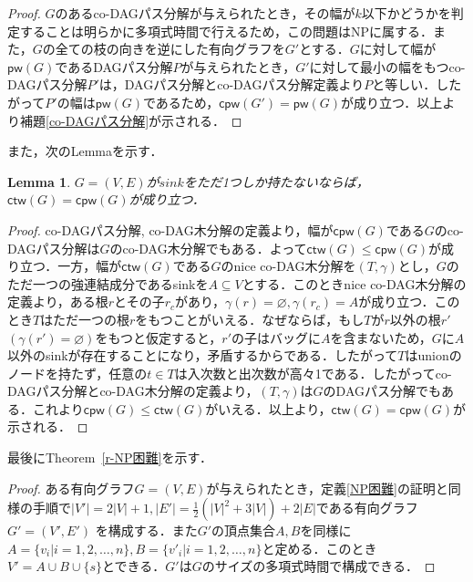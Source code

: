\documentclass[master]{kuisthesis}		%
\theoremstyle{plain}
\newtheorem{lemma}{Lemma}
\theoremstyle{definition}
\begin{document}
{\begin{proof}
    $G$のあるco-DAGパス分解が与えられたとき，その幅が$k$以下かどうかを判定することは明らかに多項式時間で行えるため，この問題はNPに属する．また，$G$の全ての枝の向きを逆にした有向グラフを$G'$とする．$G$に対して幅が$\mathsf{pw}(G)$であるDAGパス分解$P$が与えられたとき，$G'$に対して最小の幅をもつco-DAGパス分解$P'$は，DAGパス分解とco-DAGパス分解定義より$P$と等しい．したがって$P'$の幅は$\mathsf{pw}(G)$であるため，$\mathsf{cpw}(G')= \mathsf{pw}(G)$が成り立つ．以上より補題\ref{co-DAGパス分解}が示される．
\end{proof}





また，次のLemmaを示す．

\begin{lemma}\label{r-sink}
    $G =(V, E)$が$sink$をただ1つしか持たないならば，$\mathsf{ctw}(G) = \mathsf{cpw}(G)$が成り立つ．
\end{lemma}

\begin{proof}
    co-DAGパス分解, co-DAG木分解の定義より，幅が$\mathsf{cpw}(G)$である$G$のco-DAGパス分解は$G$のco-DAG木分解でもある．よって$\mathsf{ctw}(G) \leq \mathsf{cpw}(G)$が成り立つ．一方，幅が$\mathsf{ctw}(G)$である$G$のnice co-DAG木分解を$(T, \gamma)$とし，$G$のただ一つの強連結成分であるsinkを$A \subseteq V$とする．このときnice co-DAG木分解の定義より，ある根$r$とその子$r_c$があり，$\gamma(r) = \varnothing, \gamma(r_c) = A$が成り立つ．このとき$T$はただ一つの根$r$をもつことがいえる．なぜならば，もし$T$が$r$以外の根$r'$ $(\gamma(r') = \varnothing)$をもつと仮定すると，$r'$の子はバッグに$A$を含まないため，$G$に$A$以外のsinkが存在することになり，矛盾するからである．したがって$T$はunionのノードを持たず，任意の$t \in T$は入次数と出次数が高々1である．したがってco-DAGパス分解とco-DAG木分解の定義より，$(T, \gamma)$は$G$のDAGパス分解でもある．これより$\mathsf{cpw}(G) \leq \mathsf{ctw}(G)$がいえる．以上より，$\mathsf{ctw}(G) = \mathsf{cpw}(G)$が示される．
\end{proof}





最後にTheorem~\ref{r-NP困難}を示す．

\begin{proof}
    ある有向グラフ$G = (V, E)$が与えられたとき，定義\ref{NP困難}の証明と同様の手順で$|V'| = 2|V| + 1, |E'| = \frac{1}{2}(|V|^2 + 3|V|) + 2|E|$である有向グラフ$G' = (V', E')$ を構成する．また$G'$の頂点集合$A, B$を同様に$A = \{v_i | i =1, 2, \dots, n\}, B = \{v'_i | i =1, 2, \dots, n\}$と定める．このとき$V' = A \cup B \cup \{s\}$とできる．$G'$は$G$のサイズの多項式時間で構成できる．
    

\end{proof}}
\end{document}
